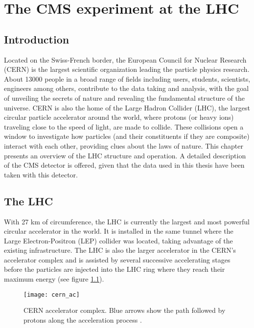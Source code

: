 \chapter{The CMS experiment at the LHC}\label{ch:cms}

\section{Introduction}\label{sec:cms_intro}
\noindent Located on the Swiss-French border, the European Council for Nuclear Research (CERN) is the largest scientific organization leading the particle physics research. About 13000 people in a broad range of fields including users, students, scientists, engineers among others, contribute to the data taking and analysis, with the goal of unveiling the secrets of nature and revealing the fundamental structure of the universe. CERN is also the home of the Large Hadron Collider (LHC), the largest circular particle accelerator around the world, where protons (or heavy ions) traveling close to the speed of light, are made to collide. These collisions open a window to investigate how particles (and their constituents if they are composite) interact with each other, providing clues about the laws of nature. This chapter presents an overview of the LHC structure and operation. A detailed description of the CMS detector is offered, given that the data used in this thesis have been taken with this detector.     

\section{The LHC}\label{sec:lhc}

\noindent With 27 km of circumference, the LHC is currently the largest and most powerful circular accelerator in the world. It is installed in the same tunnel where the Large Electron-Positron (LEP) collider was located, taking advantage of the existing infrastructure. The LHC is also the larger accelerator in the CERN's accelerator complex and is assisted by several successive accelerating stages before the particles are injected into the LHC ring where they reach their maximum energy (see figure \ref{fig:cern}).

\begin{figure}[!h]
  \centering
  \texttt{[image: cern\_ac]}
  \caption[CERN accelerator complex]{CERN accelerator complex. Blue arrows show the path followed by protons along the acceleration process \cite{cern}.}\label{fig:cern}
\end{figure}

